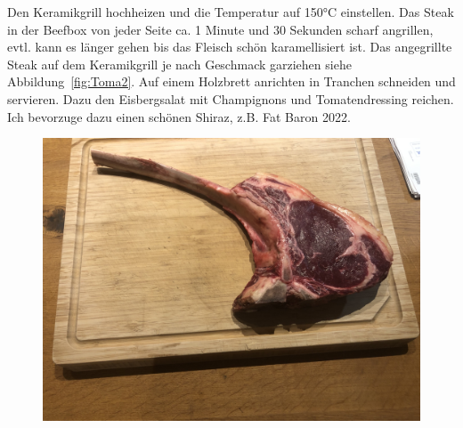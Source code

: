Den Keramikgrill hochheizen und die Temperatur auf 150°C einstellen.
Das Steak in der Beefbox von jeder Seite ca. 1 Minute und 30 Sekunden scharf 
angrillen, evtl. kann es länger gehen bis das Fleisch schön karamellisiert ist.
Das angegrillte Steak auf dem Keramikgrill je nach Geschmack garziehen siehe 
Abbildung~\vref{fig:Toma2}. Auf einem Holzbrett anrichten in Tranchen 
schneiden und servieren.
Dazu den Eisbergsalat mit Champignons und Tomatendressing reichen.
Ich bevorzuge dazu einen schönen Shiraz, z.B. Fat Baron 2022.
\newpage
\begin{figure}[htbp]
	\centering
	\begin{minipage}{1\textwidth}
	\centering	
	\includegraphics[width=1\linewidth]{pics/Tomahawk_roh}
	\label{fig:Toma1}
	\end{minipage}
\end{figure}

